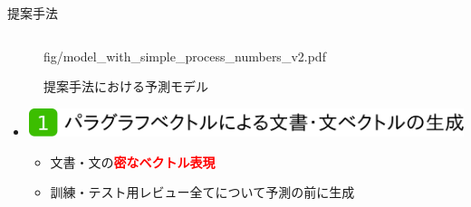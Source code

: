 \documentclass[unicode,10pt]{beamer}
\newlength{\mycolumnwidth}
\newlength{\mytitlefigureheight}
\newcommand{\arrow}{\textcolor{ttiblue}{\textbf{→}}\hspace{1ex}}
\newcommand{\itemtitle}[1]{\textbf{#1}\\}
\newcommand{\fire}[1]{\textcolor{red}{\textbf{#1}}}
\begin{document}
\begin{frame}[t]
\begin{block}{提案手法}
\begin{columns}[onlytextwidth,t]
\begin{column}{\mycolumnwidth}
\begin{figure}
                        {fig/model_with_simple_process_numbers_v2.pdf}
        \caption*{提案手法における予測モデル}
      \end{figure}
      \vspace{-0.75em} %
      \begin{itemize}
        \item \itemtitle{\includegraphics[height=\mytitlefigureheight]
                                         {fig/poster_model_title_1.pdf}}
          \begin{itemize}
            \item 文書・文の\fire{密なベクトル表現}
            \item 訓練・テスト用レビュー全てについて予測の前に生成
          \end{itemize}
      \end{itemize}
    \end{column}


\end{columns}
\end{block}
\end{frame}
\end{document}
